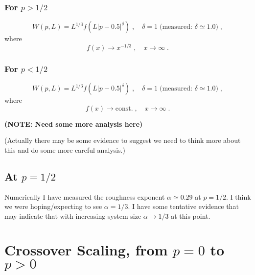 \documentclass[a4paper,10pt]{article}
\begin{document}
\subsubsection{For $p>1/2$}

\begin{equation}
  W(p,L) = L^{1/3} f(L|p-0.5|^\delta) \;, \quad \delta = 1 \; \mbox{(measured: $\delta \simeq 1.0$)} \;,
\end{equation}
where
\begin{equation}
  f(x) \to x^{-1/3} \;, \quad x \to \infty \;.
\end{equation}

\subsubsection{For $p < 1/2$}

\begin{equation}
  W(p,L) = L^{1/3} f(L|p-0.5|^\delta) \;, \quad \delta = 1 \; \mbox{(measured: $\delta \simeq 1.0$)} \;,
\end{equation}
where
\begin{equation}
  f(x) \to \mbox{const.} \;, \quad x \to \infty \;.
\end{equation}

{\bf (NOTE: Need some more analysis here)}

(Actually there may be some evidence to suggest we need to think more about this and do some more careful analysis.)

\subsection{At $p=1/2$}

Numerically I have measured the roughness exponent $\alpha \simeq 0.29$ at $p=1/2$. I think we were hoping/expecting to see $\alpha=1/3$. I have some tentative evidence that may indicate that with increasing system size $\alpha \to 1/3$ at this point.


\newpage
\section{Crossover Scaling, from $p=0$ to $p > 0$}
\end{document}
